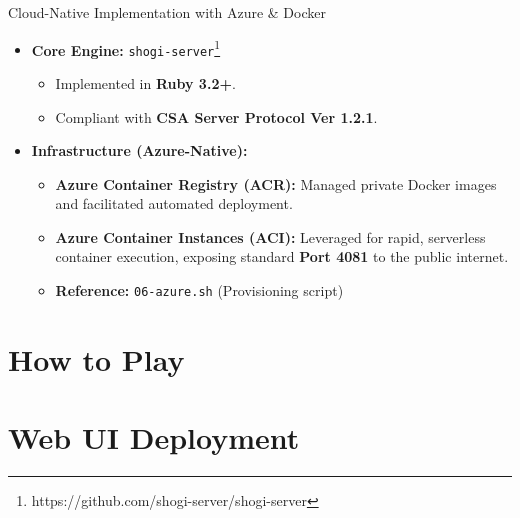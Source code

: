 \documentclass[aspectratio=169]{beamer}
\begin{document}
\begin{frame}{Cloud-Native Implementation with Azure \& Docker}
    \begin{itemize}
        \item \textbf{Core Engine:} \texttt{shogi-server}\footnote{https://github.com/shogi-server/shogi-server}
            \begin{itemize}
                \item Implemented in \textbf{Ruby 3.2+}.
                \item Compliant with \textbf{CSA Server Protocol Ver 1.2.1}.
            \end{itemize}
        
        \item \textbf{Infrastructure (Azure-Native):}
            \begin{itemize}
                \item \textbf{Azure Container Registry (ACR):} Managed private Docker images and facilitated automated deployment.
                \item \textbf{Azure Container Instances (ACI):} Leveraged for rapid, serverless container execution, exposing standard \textbf{Port 4081} to the public internet.
                \item \textbf{Reference:} \texttt{06-azure.sh} (Provisioning script)
            \end{itemize}
    \end{itemize}
\end{frame}

\section{How to Play}

\section{Web UI Deployment}
\end{document}

